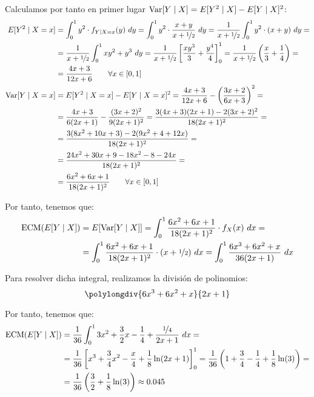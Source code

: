 \begin{ejercicio}
\begin{enumerate}
        Calculamos por tanto en primer lugar $\operatorname{Var}[Y\mid X] = E[Y^2\mid X] - E[Y\mid X]^2$:
        \begin{align*}
            E[Y^2\mid X = x] &= \int_{0}^{1} y^2\cdot f_{Y\mid X=x}(y) \ dy
            = \int_{0}^{1} y^2\cdot \dfrac{x+y}{x+\nicefrac{1}{2}} \ dy
            = \dfrac{1}{x+\nicefrac{1}{2}}\int_{0}^{1} y^2\cdot (x+y) \ dy
            =\\&= \dfrac{1}{x+\nicefrac{1}{2}}\int_{0}^{1} xy^2+y^3 \ dy
            = \dfrac{1}{x+\nicefrac{1}{2}}\left[\frac{xy^3}{3}+\frac{y^4}{4}\right]_{0}^{1}
            = \dfrac{1}{x+\nicefrac{1}{2}}\left(\frac{x}{3}+\frac{1}{4}\right)
            =\\&= \dfrac{4x+3}{12x+6} \qquad \forall x\in[0,1]\\
            \Var[Y\mid X = x] &= E[Y^2\mid X = x] - E[Y\mid X = x]^2
            = \dfrac{4x+3}{12x+6} - \left(\dfrac{3x+2}{6x+3}\right)^2
            =\\&= \dfrac{4x+3}{6(2x+1)} - \dfrac{(3x+2)^2}{9(2x+1)^2}
            = \dfrac{3(4x+3)(2x+1)-2(3x+2)^2}{18(2x+1)^2}
            =\\&= \dfrac{3(8x^2+10x+3)-2(9x^2+4+12x)}{18(2x+1)^2}
            =\\&= \dfrac{24x^2+30x+9-18x^2-8-24x}{18(2x+1)^2}
            =\\&= \dfrac{6x^2+6x+1}{18(2x+1)^2} \qquad \forall x\in[0,1]
        \end{align*}

        Por tanto, tenemos que:
        \begin{align*}
            \text{ECM}(E[Y\mid X]) &= E[\Var[Y\mid X]]
            = \int_{0}^{1} \dfrac{6x^2+6x+1}{18(2x+1)^2} \cdot f_X(x) \ dx
            =\\&= \int_{0}^{1} \dfrac{6x^2+6x+1}{18(2x+1)^2} \cdot (x+\nicefrac{1}{2}) \ dx
            = \int_{0}^{1} \dfrac{6x^3+6x^2+x}{36(2x+1)} \ dx
        \end{align*}

        Para resolver dicha integral, realizamos la división de polinomios:
        $$\polylongdiv{6x^3+6x^2+x}{2x+1}$$

        Por tanto, tenemos que:
        \begin{align*}
            \text{ECM}(E[Y\mid X]) &= \dfrac{1}{36}\int_{0}^{1} 3x^2+\dfrac{3}{2}x-\dfrac{1}{4} + \dfrac{\nicefrac{1}{4}}{2x+1} \ dx
            =\\&= \dfrac{1}{36}\left[x^3+\dfrac{3}{4}x^2-\dfrac{x}{4} + \dfrac{1}{8}\ln(2x+1)\right]_{0}^{1}
            = \dfrac{1}{36}\left(1+\dfrac{3}{4}-\dfrac{1}{4} + \dfrac{1}{8}\ln(3)\right)
            =\\&= \dfrac{1}{36}\left(\dfrac{3}{2} + \dfrac{1}{8}\ln(3)\right)\approx 0.045
        \end{align*}


\end{enumerate}
\end{ejercicio}
